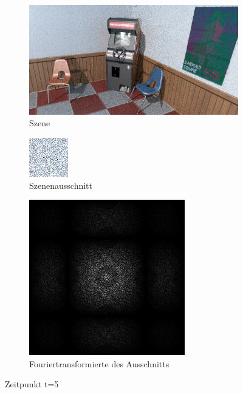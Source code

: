 \begin{figure}[H]
    \begin{subfigure}{\textwidth}   
        \centering \includegraphics[scale=.25]{content/TemporalerAlg/Bilder/Sorting/Screenshots/seed_debug_8.0_selection.png}
        \caption{Szene}
        \label{fig:Nur_Sorting_Szene_t6}
    \end{subfigure}
    \begin{subfigure}{0.5\textwidth}
        \centering\includegraphics[width=0.4\linewidth]{content/TemporalerAlg/Bilder/Sorting/Screenshots/seed_debug_8.0_ausschnitt.png} 
        \caption{Szenenausschnitt}
        \label{fig:Nur_Sorting_ausschnitt_t6}
    \end{subfigure}
    \begin{subfigure}{0.5\textwidth}
        \centering\includegraphics[width=0.4\linewidth]{content/TemporalerAlg/Bilder/Sorting/Screenshots/Spektren/seed_debug_8.0_ausschnitt.png}
        \caption{Fouriertransformierte des Ausschnitts}
        \label{fig:Nur_Sorting_Fouriertransformierte_t6}
    \end{subfigure}
        \caption{Zeitpunkt t=5}
        \label{fig:Nur_Sorting_Verlauf_t6}
\end{figure}

